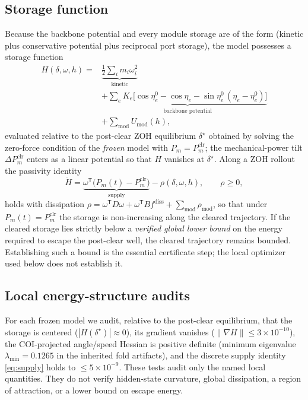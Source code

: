 \documentclass[journal]{IEEEtran}
\begin{document}
\subsection{Storage function}
Because the backbone potential and every module storage are of the form
(kinetic plus conservative potential plus reciprocal port storage), the model
possesses a storage function
\begin{equation}
\begin{aligned}
H(\delta,\omega,h) ={}&
\underbrace{\tfrac12\sum_i m_i\omega_i^2}_{\text{kinetic}}\\
&+
\underbrace{\sum_e K_e\bigl[\cos\eta_e^0-\cos\eta_e
-\sin\eta_e^0\,(\eta_e-\eta_e^0)\bigr]}_{\text{backbone potential}}\\
&+\sum_{\text{mod}} U_{\text{mod}}(h),
\end{aligned}
\label{eq:storage}
\end{equation}
evaluated relative to the post-clear ZOH equilibrium $\delta^{\star}$ obtained by
solving the zero-force condition of the \emph{frozen} model with
$P_m{=}P_m^{\mathrm{clr}}$; the mechanical-power tilt $\Delta
P_m^{\mathrm{clr}}$ enters as a linear potential so that $H$ vanishes at
$\delta^{\star}$. Along a ZOH rollout the passivity identity
\begin{equation}
\dot H = \underbrace{\omega^{\mathsf T}\bigl(P_m(t)-P_m^{\mathrm{clr}}\bigr)}_{\text{supply}}
-\rho(\delta,\omega,h),\qquad \rho\geq 0,
\label{eq:supply}
\end{equation}
holds with dissipation $\rho=\omega^{\mathsf T}D\omega+\omega^{\mathsf
T}B f^{\text{diss}}+\sum_{\text{mod}}\rho_{\text{mod}}$, so that under
$P_m(t)=P_m^{\mathrm{clr}}$ the storage is non-increasing along the cleared
trajectory. If the cleared storage lies strictly below a \emph{verified global
lower bound} on the energy required to escape the post-clear well, the cleared
trajectory remains bounded. Establishing such a bound is the essential
certificate step; the local optimizer used below does not establish it.

\subsection{Local energy-structure audits}
For each frozen model we audit, relative to the post-clear equilibrium, that the
storage is centered ($|H(\delta^{\star})|\approx 0$), its gradient vanishes
($\|\nabla H\|\leq 3\times10^{-10}$), the COI-projected angle/speed Hessian is
positive definite (minimum eigenvalue $\lambda_{\min}=0.1265$ in the inherited
fold artifacts), and the discrete supply identity \eqref{eq:supply} holds to
$\leq 5\times10^{-9}$. These tests audit only the named local quantities. They
do not verify hidden-state curvature, global dissipation, a region of
attraction, or a lower bound on escape energy.
\end{document}
